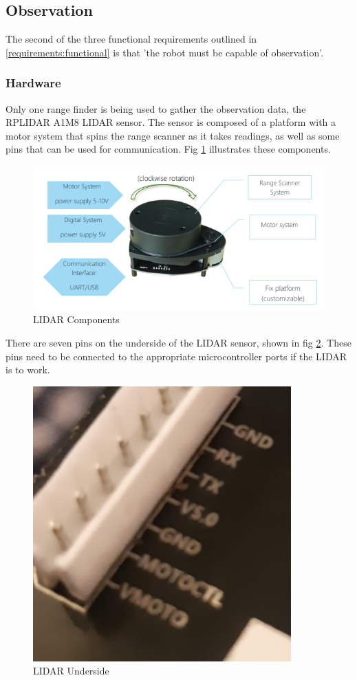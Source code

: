 			\subsection{Observation}
			The second of the three functional requirements outlined in \ref{requirements:functional} is that 'the robot must be capable of observation'.
				\subsubsection{Hardware}
				Only one range finder is being used to gather the observation data, the RPLIDAR A1M8 LIDAR sensor. The sensor is composed of a platform with a motor system that spins the range scanner as it takes readings, as well as some pins that can be used for communication. Fig \ref{fig:rplidarconfig} illustrates these components.
				
				\begin{figure}[h]
					\centering
					\includegraphics[width=.9\linewidth]{SYNTHESIS/rplidar_configuration.png}
					\caption{LIDAR Components}
					\label{fig:rplidarconfig}
				\end{figure}
			
				There are seven pins on the underside of the LIDAR sensor, shown in fig \ref{fig:lidarunderside}. These pins need to be connected to the appropriate microcontroller ports if the LIDAR is to work. 
				\begin{figure}[h]
					\centering
					\includegraphics[width=.4\linewidth]{SYNTHESIS/lidarunderside.png}
					\caption{LIDAR Underside}
					\label{fig:lidarunderside}
				\end{figure}
				
